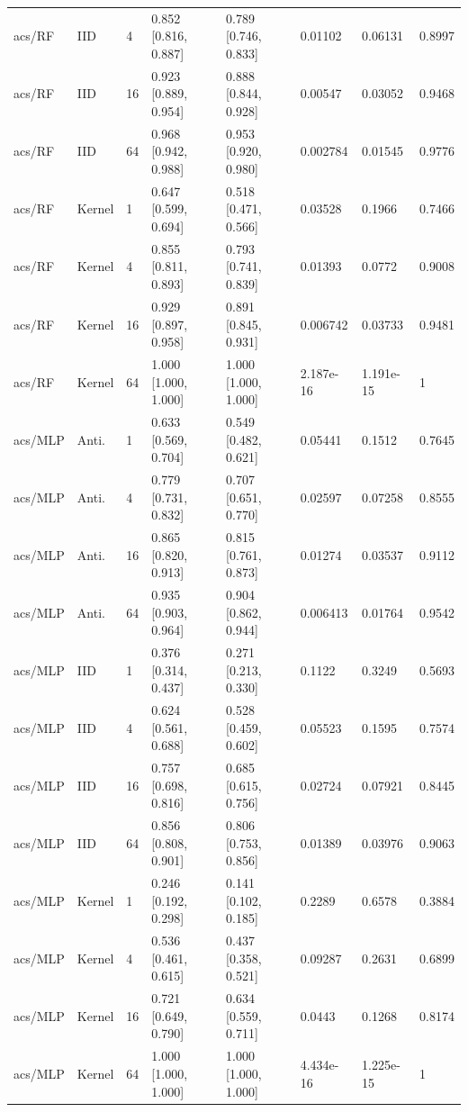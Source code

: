 \begin{tabular}{llllllll}
acs/RF & IID & 4 & 0.852 [0.816, 0.887] & 0.789 [0.746, 0.833] & 0.01102 & 0.06131 & 0.8997 \\
acs/RF & IID & 16 & 0.923 [0.889, 0.954] & 0.888 [0.844, 0.928] & 0.00547 & 0.03052 & 0.9468 \\
acs/RF & IID & 64 & 0.968 [0.942, 0.988] & 0.953 [0.920, 0.980] & 0.002784 & 0.01545 & 0.9776 \\
acs/RF & Kernel & 1 & 0.647 [0.599, 0.694] & 0.518 [0.471, 0.566] & 0.03528 & 0.1966 & 0.7466 \\
acs/RF & Kernel & 4 & 0.855 [0.811, 0.893] & 0.793 [0.741, 0.839] & 0.01393 & 0.0772 & 0.9008 \\
acs/RF & Kernel & 16 & 0.929 [0.897, 0.958] & 0.891 [0.845, 0.931] & 0.006742 & 0.03733 & 0.9481 \\
acs/RF & Kernel & 64 & 1.000 [1.000, 1.000] & 1.000 [1.000, 1.000] & 2.187e-16 & 1.191e-15 & 1 \\
acs/MLP & Anti. & 1 & 0.633 [0.569, 0.704] & 0.549 [0.482, 0.621] & 0.05441 & 0.1512 & 0.7645 \\
acs/MLP & Anti. & 4 & 0.779 [0.731, 0.832] & 0.707 [0.651, 0.770] & 0.02597 & 0.07258 & 0.8555 \\
acs/MLP & Anti. & 16 & 0.865 [0.820, 0.913] & 0.815 [0.761, 0.873] & 0.01274 & 0.03537 & 0.9112 \\
acs/MLP & Anti. & 64 & 0.935 [0.903, 0.964] & 0.904 [0.862, 0.944] & 0.006413 & 0.01764 & 0.9542 \\
acs/MLP & IID & 1 & 0.376 [0.314, 0.437] & 0.271 [0.213, 0.330] & 0.1122 & 0.3249 & 0.5693 \\
acs/MLP & IID & 4 & 0.624 [0.561, 0.688] & 0.528 [0.459, 0.602] & 0.05523 & 0.1595 & 0.7574 \\
acs/MLP & IID & 16 & 0.757 [0.698, 0.816] & 0.685 [0.615, 0.756] & 0.02724 & 0.07921 & 0.8445 \\
acs/MLP & IID & 64 & 0.856 [0.808, 0.901] & 0.806 [0.753, 0.856] & 0.01389 & 0.03976 & 0.9063 \\
acs/MLP & Kernel & 1 & 0.246 [0.192, 0.298] & 0.141 [0.102, 0.185] & 0.2289 & 0.6578 & 0.3884 \\
acs/MLP & Kernel & 4 & 0.536 [0.461, 0.615] & 0.437 [0.358, 0.521] & 0.09287 & 0.2631 & 0.6899 \\
acs/MLP & Kernel & 16 & 0.721 [0.649, 0.790] & 0.634 [0.559, 0.711] & 0.0443 & 0.1268 & 0.8174 \\
acs/MLP & Kernel & 64 & 1.000 [1.000, 1.000] & 1.000 [1.000, 1.000] & 4.434e-16 & 1.225e-15 & 1 \\
\bottomrule
\end{tabular}

